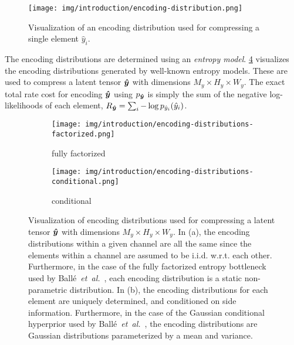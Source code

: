 \begin{figure}[htbp]
  \centering
  \texttt{[image: img/introduction/encoding-distribution.png]}
  \caption[Visualization of an encoding distribution for a single element]{%
    Visualization of an encoding distribution used for compressing a single element $\hat{y}_i$.%
  }
  \label{fig:intro/encoding-distribution}
\end{figure}


The encoding distributions are determined using an \emph{entropy model}.
\cref{fig:intro/encoding-distributions} visualizes the encoding distributions generated by well-known entropy models.
These are used to compress a latent tensor ${\boldsymbol{\hat{y}}}$ with dimensions $M_y \times H_y \times W_y$.
The exact total rate cost for encoding ${\boldsymbol{\hat{y}}}$ using $p_{{\boldsymbol{\hat{y}}}}$ is simply the sum of the negative log-likelihoods of each element, $R_{{\boldsymbol{\hat{y}}}} = \sum_i -\log p_{{\hat{y}}_i}({\hat{y}}_i)$.


\begin{figure}[htbp]
  \centering
  \begin{subfigure}[b]{0.5\linewidth}
    \centering
    \texttt{[image: img/introduction/encoding-distributions-factorized.png]}
    \caption{fully factorized}
    \label{fig:intro/encoding-distributions/factorized}
  \end{subfigure}%
  \begin{subfigure}[b]{0.5\linewidth}
    \centering
    \texttt{[image: img/introduction/encoding-distributions-conditional.png]}
    \caption{conditional}
    \label{fig:intro/encoding-distributions/conditional}
  \end{subfigure}%
  \caption[Visualization of encoding distributions for a latent tensor]{%
    Visualization of encoding distributions used for compressing a latent tensor ${\boldsymbol{\hat{y}}}$ with dimensions $M_y \times H_y \times W_y$.
    In (a), the encoding distributions within a given channel are all the same since the elements within a channel are assumed to be i.i.d. w.r.t. each other.
    Furthermore, in the case of the fully factorized entropy bottleneck used by Ballé~\emph{et~al.}~\cite{balle2018variational}, each encoding distribution is a static non-parametric distribution.
    In (b), the encoding distributions for each element are uniquely determined, and conditioned on side information.
    Furthermore, in the case of the Gaussian conditional hyperprior used by Ballé~\emph{et~al.}~\cite{balle2018variational}, the encoding distributions are Gaussian distributions parameterized by a mean and variance.%
  }
  \label{fig:intro/encoding-distributions}
\end{figure}


